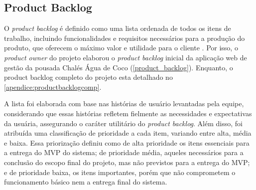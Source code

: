 \documentclass[
	12pt,				%
	openany,			%
	oneside,			%
	a4paper,			%
	english,			%
	french,				%
	spanish,			%
	brazil				%
	]{abntex2}
\begin{document}
\subsection{Product Backlog}
O \textit{product backlog} é definido como uma lista ordenada de todos os itens de trabalho, incluindo funcionalidades e requisitos necessários para a produção do produto, que oferecem o máximo valor e utilidade para o cliente \cite{scrumguide}. Por isso, o \textit{product owner} do projeto elaborou o \textit{product backlog} inicial da aplicação web de gestão da pousada Chalés Água de Coco (\autoref{product_backlog}). Enquanto, o product backlog completo do projeto esta detalhado no \autoref{apendice:productbacklogcomp}.

A lista foi elaborada com base nas histórias de usuário levantadas pela equipe, considerando que essas histórias refletem fielmente as necessidades e expectativas da usuária, assegurando o caráter utilitário do \textit{product backlog}. Além disso, foi atribuída uma classificação de prioridade a cada item, variando entre alta, média e baixa. Essa priorização definiu como de alta prioridade os itens essenciais para a entrega do MVP do sistema; de prioridade média, aqueles necessários para a conclusão do escopo final do projeto, mas não previstos para a entrega do MVP; e de prioridade baixa, os itens importantes, porém que não comprometem o funcionamento básico nem a entrega final do sistema.
\end{document}
